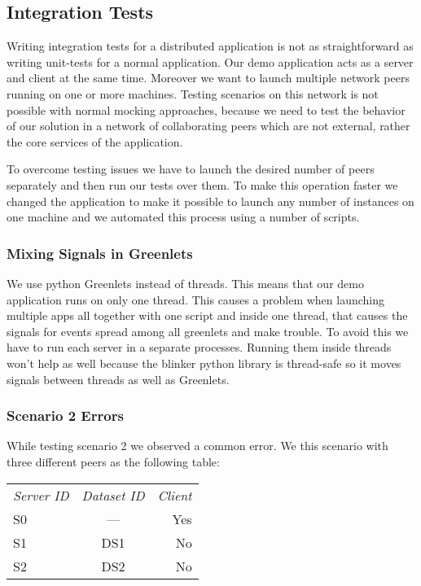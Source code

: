 \subsection{Integration Tests}
Writing integration tests for a distributed application is not as straightforward as writing unit-tests for a normal application. 
Our demo application acts as a server and client at the same time. Moreover we want to launch multiple 
network peers running on one or more machines. Testing scenarios on this network is not possible with
normal mocking approaches, because we need to test the behavior of our solution in a network of collaborating
peers which are not external, rather the core services of the application.

To overcome testing issues we have to launch the desired number of peers separately and then run our tests 
over them. To make this operation faster we changed the application to make it possible to launch any number
of instances on one machine and we automated this process using a number of scripts. %

\subsubsection{Mixing Signals in Greenlets}
We use python Greenlets instead of threads. This means that our demo application runs on only one thread. 
This causes a problem when launching multiple apps all together with one script and inside one thread, that
causes the signals for events spread among all greenlets and make trouble. To avoid this we have to run
each server in a separate processes. Running them inside threads won't help as well because the blinker python
library is thread-safe so it moves signals between threads as well as Greenlets.

\iffalse
\subsubsection{Scenario 2 Errors}
While testing scenario 2 we observed a common error. We this scenario with three different peers as the following table:

\begin{tabular}{ l c r }
\em{Server ID} & \em{ Dataset ID} & \em{ Client} \\
S0 & --- & Yes \\
S1 & DS1 & No \\
S2 & DS2 & No \\
\end{tabular}\\

